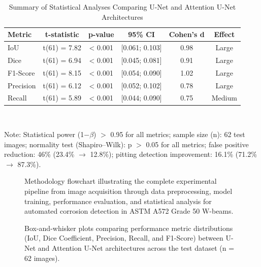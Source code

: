 \documentclass[Journal,letterpaper]{ascelike-new}
\begin{document}
\begin{table}[htbp]
\caption{Summary of Statistical Analyses Comparing U-Net and Attention U-Net Architectures}
\label{tab:statistical_summary}
\centering
\small
\renewcommand{\arraystretch}{1.2}
\begin{tabular}{l c c c c c}
\hline\hline
\textbf{Metric} & \textbf{t-statistic} & \textbf{p-value} & \textbf{95\% CI} & \textbf{Cohen's d} & \textbf{Effect} \\
\hline
IoU & t(61) = 7.82 & < 0.001 & [0.061; 0.103] & 0.98 & Large \\
Dice & t(61) = 6.94 & < 0.001 & [0.045; 0.081] & 0.91 & Large \\
F1-Score & t(61) = 8.15 & < 0.001 & [0.054; 0.090] & 1.02 & Large \\
Precision & t(61) = 6.12 & < 0.001 & [0.052; 0.102] & 0.78 & Large \\
Recall & t(61) = 5.89 & < 0.001 & [0.044; 0.090] & 0.75 & Medium \\
\hline\hline
\end{tabular}\\[2pt]
\begin{flushleft}\footnotesize
Note: Statistical power (1$-\beta$) $>$ 0.95 for all metrics; sample size (n): 62 test images; normality test (Shapiro--Wilk): p $>$ 0.05 for all metrics; false positive reduction: 46\% (23.4\% $\rightarrow$ 12.8\%); pitting detection improvement: 16.1\% (71.2\% $\rightarrow$ 87.3\%).
\end{flushleft}
\normalsize
\end{table}


\begin{figure}[htbp]
\caption{Methodology flowchart illustrating the complete experimental pipeline from image acquisition through data preprocessing, model training, performance evaluation, and statistical analysis for automated corrosion detection in ASTM A572 Grade 50 W-beams.}
\label{fig:methodology_flowchart}
\end{figure}

\begin{figure}[htbp]
\caption{Box-and-whisker plots comparing performance metric distributions (IoU, Dice Coefficient, Precision, Recall, and F1-Score) between U-Net and Attention U-Net architectures across the test dataset (n = 62 images).}
\label{fig:performance_comparison}
\end{figure}
\end{document}
